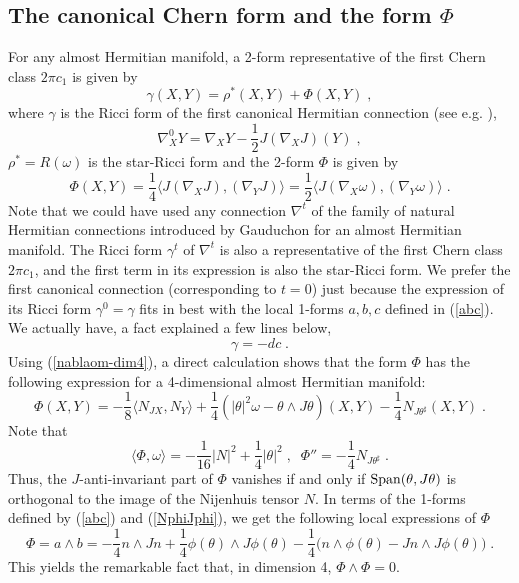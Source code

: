 \documentclass{amsart}
\newcommand{\na}{\nabla}
\begin{document}
\subsection{The canonical Chern form and the form $\Phi$} 
For any almost Hermitian manifold, a 2-form representative of the first Chern class $2\pi c_1$  is given by
\begin{equation} \label{Chernform} 
\gamma(X, Y) = \rho^*(X, Y) + \Phi(X, Y) \; , 
\end{equation}
where $\gamma$ is the Ricci form of the first canonical Hermitian connection (see e.g. \cite{gauduchon1}), 
$$\na^0_X Y = \na_X Y - \frac{1}{2}J(\na_X J)(Y) \; ,$$ 
$\rho^* = R(\omega)$ is the star-Ricci form and the 2-form $\Phi$ is given by
\begin{equation*} \label{Phi} 
\Phi(X,Y) = \frac{1}{4} \langle J(\nabla_X J), (\nabla_Y J) \rangle = \frac{1}{2} \langle J(\nabla_X \omega), (\nabla_Y \omega) \rangle \; .
\end{equation*}
Note that we could have used any connection $\nabla^t$ of the family of natural Hermitian connections introduced by Gauduchon \cite{gauduchon1} for an almost Hermitian manifold. The Ricci form $\gamma^t$ of $\nabla^t$ is also a representative of the first Chern class $2\pi c_1$, and the first term in its expression is also the star-Ricci form. We prefer the first canonical connection (corresponding to $t=0$) just because the expression of its Ricci form $\gamma^0 = \gamma$ fits in best with the local 1-forms $a,b,c$ defined in (\ref{abc}). We actually have, a fact explained a few lines below,
\begin{equation} \label{gamma=-dc}
 \gamma = - dc   \; .
\end{equation}
Using (\ref{nablaom-dim4}), a direct calculation shows that the form $\Phi$ has the following expression for a 4-dimensional almost Hermitian manifold:
\begin{equation} \label{Phi4d}
\Phi(X,Y) = - \frac{1}{8} \langle N_{JX}, N_Y \rangle + \frac{1}{4} ( |\theta|^2 \omega - \theta \wedge J\theta)(X,Y) - \frac{1}{4} N_{J\theta^{\sharp}} (X,Y) \; .
\end{equation}
Note that 
\begin{equation} \label{Phi-comp}
   \langle\Phi, \omega\rangle = -\frac{1}{16} |N|^2 +\frac{1}{4} |\theta|^2  \; , \; \; \Phi'' = - \frac{1}{4} N_{J\theta^{\sharp}} \; .
\end{equation}  
Thus, the $J$-anti-invariant part of $\Phi$ vanishes if and only if
${\rm Span}(\theta, J\theta)$ is orthogonal to the image of the Nijenhuis tensor $N$. In terms of the 1-forms defined by (\ref{abc}) and (\ref{NphiJphi}), we get the following local expressions of $\Phi$ 
\begin{equation} \label{Phi4dloc}
\Phi = a \wedge b = - \frac{1}{4} n \wedge Jn + \frac{1}{4} \phi(\theta) \wedge J\phi(\theta)- \frac{1}{4} \big( n \wedge \phi(\theta) - Jn \wedge J \phi(\theta) \big) \; .
\end{equation}
This yields the remarkable fact that, in dimension 4, $\Phi \wedge \Phi = 0$.
\end{document}
